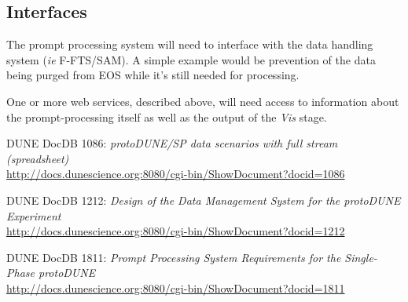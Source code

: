 \documentclass[pdftex,12pt,letter]{article}
\begin{document}
\subsection{Interfaces}
The prompt processing system will need to interface with the data handling system (\textit{ie} F-FTS/SAM). A simple example
would be prevention of the data being purged from EOS while it's still needed for processing.

One or more web services, described above, will need access to
information about the prompt-processing itself as well as the output
of the \textit{Vis} stage.


\begin{thebibliography}{1}
{DUNE DocDB 1086: \textit{ protoDUNE/SP data scenarios with full stream (spreadsheet)}}\\
\url{http://docs.dunescience.org:8080/cgi-bin/ShowDocument?docid=1086}





{DUNE DocDB 1212: \textit{Design of the Data Management System for the protoDUNE Experiment}}\\
\url{http://docs.dunescience.org:8080/cgi-bin/ShowDocument?docid=1212}

{DUNE DocDB 1811: \textit{Prompt Processing System Requirements for the Single-Phase protoDUNE}}\\
\url{http://docs.dunescience.org:8080/cgi-bin/ShowDocument?docid=1811}


\end{thebibliography}
\end{document}
